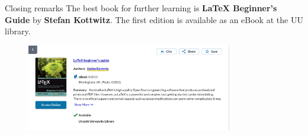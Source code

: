 \begin{frame}{Closing remarks}
    The best book for further learning is \textbf{LaTeX Beginner's Guide} by \textbf{Stefan Kottwitz}. 
    The first edition is available as an eBook at the UU library.
    \begin{figure}
        \centering
    \includegraphics[width=0.8\textwidth]{images/kottwitz_book.pdf}
\end{figure}
\end{frame}